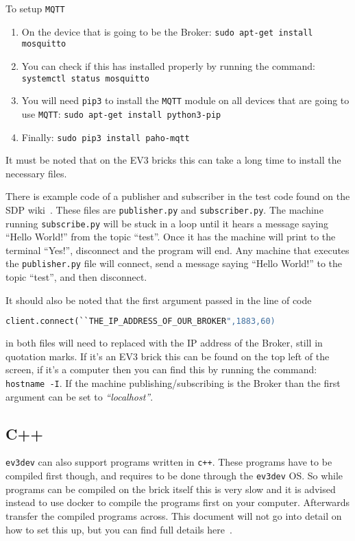 \documentclass{article}
\begin{document}
To setup \texttt{MQTT}
\begin{enumerate}
    \item On the device that is going to be the Broker: \texttt{sudo apt-get install mosquitto}
    \item You can check if this has installed properly by running the command: \texttt{systemctl status mosquitto}
    \item You will need \texttt{pip3} to install the \texttt{MQTT} module on all devices that are going to use \texttt{MQTT}: \texttt{sudo apt-get install python3-pip}
    \item Finally: \texttt{sudo pip3 install paho-mqtt}
\end{enumerate}

It must be noted that on the EV3 bricks this can take a long time to install the necessary files. 

There is example code of a publisher and subscriber in the test code found on the SDP wiki~\cite{sdpWiki}. These files are \texttt{publisher.py} and \texttt{subscriber.py}. The machine running \texttt{subscribe.py} will be stuck in a loop until it hears a message saying ``Hello World!'' from the topic ``test''. Once it has the machine will print to the terminal ``Yes!'', disconnect and the program will end. Any machine that executes the \texttt{publisher.py} file will connect, send a message saying ``Hello World!'' to the topic ``test'', and then disconnect. 

It should also be noted that the first argument passed in the line of code 

\begin{lstlisting}[language=Python]
client.connect(``THE_IP_ADDRESS_OF_OUR_BROKER",1883,60)
\end{lstlisting}

in both files will need to replaced with the IP address of the Broker, still in quotation marks. If it's an EV3 brick this can be found on the top left of the screen, if it's a computer then you can find this by running the command: \texttt{hostname -I}. If the machine publishing/subscribing is the Broker than the first argument can be set to \textit{``localhost''}. 

\subsection{C++}
\texttt{ev3dev} can also support programs written in \texttt{c++}. These programs have to be compiled first though, and requires to be done through the \texttt{ev3dev} OS. So while programs can be compiled on the brick itself this is very slow and it is advised instead to use docker to compile the programs first on your computer. Afterwards transfer the compiled programs across. This document will not go into detail on how to set this up, but you can find full details here~\cite{cppCompile}.





\end{document}
